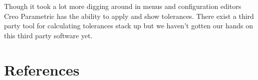 \documentclass[aip,amsmath,reprint, author-year]{revtex4-1}
\begin{document}
Though it took a lot more digging around in menus and configuration editors Creo Parametric has the ability to apply and show tolerances. There exist a third party tool for calculating tolerances stack up but we haven't gotten our hands on this third party software yet.


\section*{References}

\end{document}
